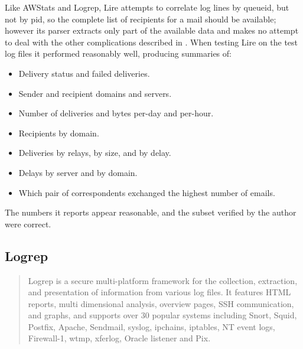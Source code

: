 Like AWStats and Logrep, Lire attempts to correlate log lines by queueid,
but not by \gls{pid}, so the complete list of recipients for a mail should
be available; however its parser extracts only part of the available data
and makes no attempt to deal with the other complications described in
.  When testing Lire on the \numberOFlogFILES{}
test log files it performed reasonably well, producing summaries of: 

\begin{itemize}

    \item Delivery status and failed deliveries.

    \item Sender and recipient domains and servers.

    \item Number of deliveries and bytes per-day and per-hour.

    \item Recipients by domain.

    \item Deliveries by relays, by size, and by delay.

    \item Delays by server and by domain.

    \item Which pair of correspondents exchanged the highest number of
        emails.

\end{itemize}

The numbers it reports appear reasonable, and the subset verified by the
author were correct.  

\subsection{Logrep}

\begin{quotation}

    Logrep is a secure multi-platform framework for the collection,
    extraction, and presentation of information from various log files. It
    features HTML reports, multi dimensional analysis, overview pages, SSH
    communication, and graphs, and supports over 30 popular systems
    including Snort, Squid, Postfix, Apache, Sendmail, syslog, ipchains,
    iptables, NT event logs, Firewall-1, wtmp, xferlog, Oracle listener and
    Pix.

\end{quotation}

